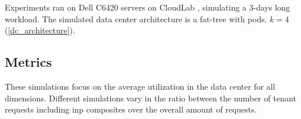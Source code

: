 Experiments ran on Dell C6420 servers on CloudLab \cite{cloudlab}, simulating a 3-days long workload. %
The simulated data center architecture is a fat-tree with
\ifdefined{} pods.
\else
$k=4$ (\autoref{dc_architecture}).
\fi

\ifdefined\THESISSUMMARY \else
\subsection{Metrics}
\fi
These simulations focus on the average  utilization in the data center for all dimensions.
Different simulations vary in the ratio between the number of tenant requests including \gls{inp} composites over the overall amount of requests.